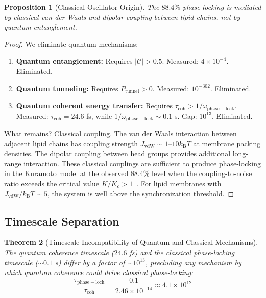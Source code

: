 \documentclass[12pt]{article}
\newtheorem{theorem}{Theorem}[section]
\newtheorem{proposition}[theorem]{Proposition}
\theoremstyle{definition}
\theoremstyle{remark}
\newcommand{\kB}{k_{\mathrm{B}}}
\begin{document}
\begin{proposition}[Classical Oscillator Origin]
\label{prop:classical_origin}
The $88.4\%$ phase-locking is mediated by classical van der Waals and dipolar coupling between lipid chains, not by quantum entanglement.
\end{proposition}

\begin{proof}
We eliminate quantum mechanisms:
\begin{enumerate}[label=(\roman*)]
    \item \textbf{Quantum entanglement:} Requires $|\mathcal{C}| > 0.5$. Measured: $4 \times 10^{-4}$. Eliminated.
    \item \textbf{Quantum tunneling:} Requires $P_{\mathrm{tunnel}} > 0$. Measured: $10^{-302}$. Eliminated.
    \item \textbf{Quantum coherent energy transfer:} Requires $\tau_{\mathrm{coh}} > 1/\omega_{\mathrm{phase-lock}}$. Measured: $\tau_{\mathrm{coh}} = 24.6$ fs, while $1/\omega_{\mathrm{phase-lock}} \sim 0.1$ s. Gap: $10^{13}$. Eliminated.
\end{enumerate}
What remains? Classical coupling. The van der Waals interaction between adjacent lipid chains has coupling strength $J_{\mathrm{vdW}} \sim 1$--$10 \kB T$ at membrane packing densities. The dipolar coupling between head groups provides additional long-range interaction. These classical couplings are sufficient to produce phase-locking in the Kuramoto model at the observed $88.4\%$ level when the coupling-to-noise ratio exceeds the critical value $K/K_c > 1$~\citep{kuramoto1984chemical}. For lipid membranes with $J_{\mathrm{vdW}} / \kB T \sim 5$, the system is well above the synchronization threshold. \qedhere
\end{proof}

\subsection{Timescale Separation}

\begin{theorem}[Timescale Incompatibility of Quantum and Classical Mechanisms]
\label{thm:timescale}
The quantum coherence timescale ($24.6$ fs) and the classical phase-locking timescale ($\sim 0.1$ s) differ by a factor of $\sim 10^{13}$, precluding any mechanism by which quantum coherence could drive classical phase-locking:
\begin{equation}
\label{eq:timescale_ratio}
\frac{\tau_{\mathrm{phase-lock}}}{\tau_{\mathrm{coh}}} = \frac{0.1}{2.46 \times 10^{-14}} \approx 4.1 \times 10^{12}
\end{equation}
\end{theorem}
\end{document}
